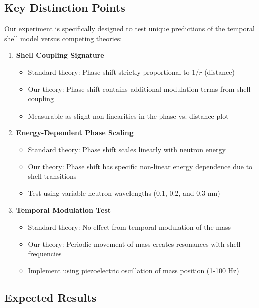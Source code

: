 \documentclass[12pt,a4paper]{article}
\begin{document}
\subsection{Key Distinction Points}

Our experiment is specifically designed to test unique predictions of the temporal shell model versus competing theories:

\begin{enumerate}
    \item \textbf{Shell Coupling Signature}
    \begin{itemize}
        \item Standard theory: Phase shift strictly proportional to $1/r$ (distance)
        \item Our theory: Phase shift contains additional modulation terms from shell coupling
        \item Measurable as slight non-linearities in the phase vs. distance plot
    \end{itemize}

    \item \textbf{Energy-Dependent Phase Scaling}
    \begin{itemize}
        \item Standard theory: Phase shift scales linearly with neutron energy
        \item Our theory: Phase shift has specific non-linear energy dependence due to shell transitions
        \item Test using variable neutron wavelengths (0.1, 0.2, and 0.3 nm)
    \end{itemize}

    \item \textbf{Temporal Modulation Test}
    \begin{itemize}
        \item Standard theory: No effect from temporal modulation of the mass
        \item Our theory: Periodic movement of mass creates resonances with shell frequencies
        \item Implement using piezoelectric oscillation of mass position (1-100 Hz)
    \end{itemize}
\end{enumerate}

\subsection{Expected Results}
\end{document}
